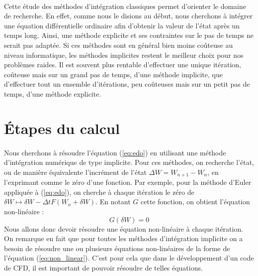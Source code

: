 \paragraph{}
Cette étude des méthodes d'intégration classiques permet d'orienter le domaine de recherche.
En effet, comme nous le disions au début, nous cherchons à intégrer une équation différentielle ordinaire afin d'obtenir la valeur de l'état après un temps long.
Ainsi, une méthode explicite et ses contraintes sur le pas de temps ne serait pas adaptée.
Si ces méthodes sont en général bien moins coûteuse au niveau informatique, les méthodes implicites restent le meilleur choix pour nos problèmes raides.
Il est souvent plus rentable d'effectuer une unique itération, coûteuse mais sur un grand pas de temps, d'une méthode implicite, que d'effectuer tout un ensemble d'itérations, peu coûteuses mais sur un petit pas de temps, d'une méthode explicite.


\section{Étapes du calcul}

	\paragraph{}
	Nous cherchons à résoudre l'équation (\ref{eq:edo}) en utilisant une méthode d'intégration numérique de type implicite.
  Pour ces méthodes, on recherche l'état, ou de manière équivalente l'incrément de l'état $\Delta W = W_{n+1} - W_n$, en l'exprimant comme le zéro d'une fonction.
  Par exemple, pour la méthode d'Euler appliquée à (\ref{eq:edo}), on cherche à chaque itération le zéro de $\delta W \mapsto \delta W - \Delta t F\left(W_n + \delta W\right)$.
	En notant $G$ cette fonction, on obtient l'équation non-linéaire :
	\begin{equation}\label{eq:non_linear}
		G\left(\delta W\right) = 0
	\end{equation}
	Nous allons donc devoir résoudre une équation non-linéaire à chaque itération.
  On remarque en fait que pour toutes les méthodes d'intégration implicite on a besoin de résoudre une ou plusieurs équations non-linéaires de la forme de l'équation (\ref{eq:non_linear}).
  C'est pour cela que dans le développement d'un code de CFD, il est important de pouvoir résoudre de telles équations.

